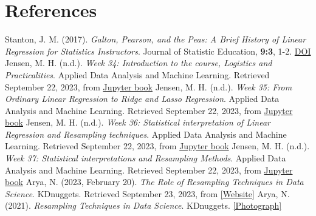 \documentclass[12pt,
               a4paper,
               article,
               oneside,
               english,oldfontcommands]{memoir}
\begin{document}
\section{References}

\begin{thebibliography}{9}
Stanton, J. M. (2017). \textit{Galton, Pearson, and the Peas: A Brief History of Linear Regression for Statistics Instructors}. Journal of Statistic Education, \textbf{9:3}, 1-2. \href{https://doi.org/10.1080/10691898.2001.11910537}{DOI}
\vspace{2mm}
Jensen, M. H. (n.d.). \textit{Week 34: Introduction to the course, Logistics and Practicalities}. Applied Data Analysis and Machine Learning. Retrieved September 22, 2023, from \href{https://compphysics.github.io/MachineLearning/doc/LectureNotes/_build/html/week34.html}{Jupyter book}
\vspace{2mm}
Jensen, M. H. (n.d.). \textit{Week 35: From Ordinary Linear Regression to Ridge and Lasso Regression}. Applied Data Analysis and Machine Learning. Retrieved September 22, 2023, from \href{https://compphysics.github.io/MachineLearning/doc/LectureNotes/_build/html/week35.html}{Jupyter book}
\vspace{2mm}
Jensen, M. H. (n.d.). \textit{Week 36: Statistical interpretation of Linear Regression and Resampling techniques}. Applied Data Analysis and Machine Learning. Retrieved September 22, 2023, from \href{https://compphysics.github.io/MachineLearning/doc/LectureNotes/_build/html/week36.html}{Jupyter book}
\vspace{2mm}
Jensen, M. H. (n.d.). \textit{Week 37: Statistical interpretations and Resampling Methods}. Applied Data Analysis and Machine Learning. Retrieved September 22, 2023, from
\href{https://compphysics.github.io/MachineLearning/doc/LectureNotes/_build/html/week37.html#the-bias-variance-tradeoff}{Jupyter book}
\vspace{2mm}
Arya, N. (2023, February 20). \textit{The Role of Resampling Techniques in Data Science}. KDnuggets. Retrieved September 23, 2023, from \href{https://www.kdnuggets.com/2023/02/role-resampling-techniques-data-science.html}{[Website]}
\vspace{2mm}
Arya, N. (2021). \textit{Resampling Techniques in Data Science}. KDnuggets. \href{https://www.kdnuggets.com/wp-content/uploads/arya_role_resampling_techniques_data_science_1.png}{[Photograph]}

\end{thebibliography}
\end{document}
